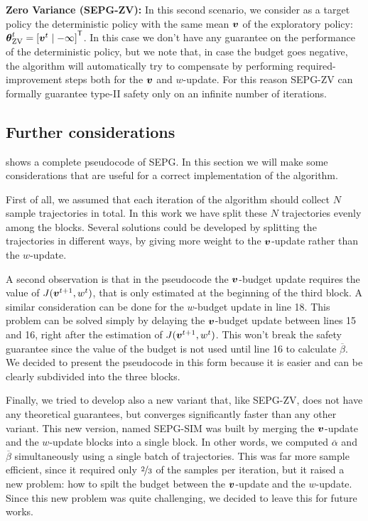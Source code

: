 \textbf{Zero Variance (SEPG-ZV):} In this second scenario, we consider as a target policy the deterministic policy with the same mean $\boldsymbol{v}$ of the exploratory policy: ${\boldsymbol{\theta}}^t_{\text{ZV}} = {[\boldsymbol{v}^t \mid -\infty]}^{\mathsf{T}}$. In this case we don't have any guarantee on the performance of the deterministic policy, but we note that, in case the budget goes negative, the algorithm will automatically  try to compensate by performing required-improvement steps both for the $\boldsymbol{v}$ and $w$-update. For this reason SEPG-ZV can formally guarantee type-II safety only on an infinite number of iterations. 




\subsection{Further considerations}
 shows a complete pseudocode of SEPG. In this section we will make some considerations that are useful for a correct implementation of the algorithm.

First of all, we assumed that each iteration of the algorithm should collect $N$ sample trajectories in total. In this work we have split these $N$ trajectories evenly among the blocks. Several solutions could be developed by splitting the trajectories in different ways, \eg by giving more weight to the $\boldsymbol{v}$-update rather than the $w$-update.

A second observation is that in the pseudocode the $\boldsymbol{v}$-budget update requires the value of $J(\boldsymbol{v}^{t+1}, w^t)$, that is only estimated at the beginning of the third block. A similar consideration can be done for the $w$-budget update in line 18. This problem can be solved simply by delaying the $\boldsymbol{v}$-budget update between lines 15 and 16, right after the estimation of $J(\boldsymbol{v}^{t+1}, w^t)$. This won't break the safety guarantee since the value of the budget is not used until line 16 to calculate $\overline{\beta}$. We decided to present the pseudocode in this form because it is easier and can be clearly subdivided into the three blocks.

Finally, we tried to develop also a new variant that, like SEPG-ZV, does not have any theoretical guarantees, but converges significantly faster than any other variant. This new version, named SEPG-SIM was built by merging the $\boldsymbol{v}$-update and the $w$-update blocks into a single block. In other words, we computed $\overline{\alpha}$ and $\overline{\beta}$ simultaneously using a single batch of trajectories. This was far more sample efficient, since it required only $\nicefrac{2}{3}$ of the samples per iteration, but it raised a new problem: how to spilt the budget between the $\boldsymbol{v}$-update and the $w$-update. Since this new problem was quite challenging, we decided to leave this for future works.